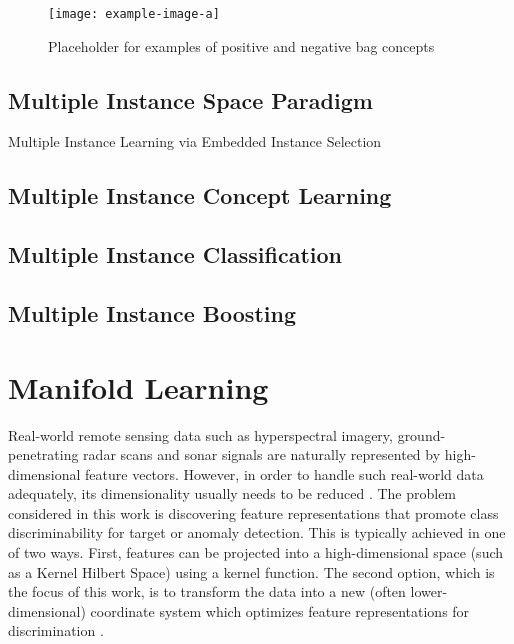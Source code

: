 \begin{center}
	\begin{figure*}[h]
		\centering
		\texttt{[image: example-image-a]}
		\caption[Multiple instance learning bags.]{Placeholder for examples of positive and negative bag concepts}
		\label{fig:bag_eg}
	\end{figure*}
\end{center}

\subsection{Multiple Instance Space Paradigm}
Multiple Instance Learning via Embedded Instance Selection

\subsection{Multiple Instance Concept Learning}

\subsection{Multiple Instance Classification}

\subsection{Multiple Instance Boosting}



\section{Manifold Learning}

Real-world remote sensing data such as hyperspectral imagery, ground-penetrating radar scans and sonar signals are naturally represented by high-dimensional feature vectors.  However, in order to handle such real-world data adequately, its dimensionality usually needs to be reduced \cite{VanDerMaaten2009DRReview,Belkin2004SemiSupLearningRiemannianManifolds}. The problem considered in this work is discovering feature representations that promote class discriminability for target or anomaly detection.  This is typically achieved in one of two ways.  First, features can be projected into a high-dimensional space (such as a Kernel Hilbert Space) using a kernel function. The second option, which is the focus of this work, is to transform the data into a new (often lower-dimensional) coordinate system which optimizes feature representations for discrimination \cite{Vural2018StudySupervisedManifoldLearning}.


